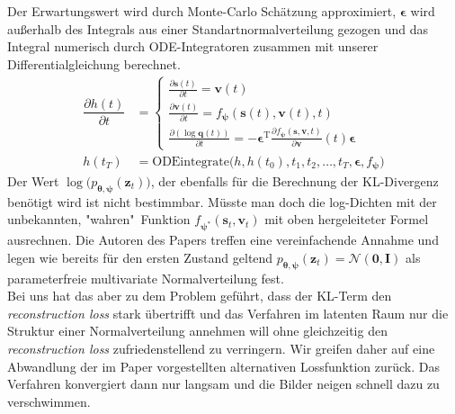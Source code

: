 \documentclass[12pt]{article}
\begin{document}
	Der Erwartungswert wird durch Monte-Carlo Schätzung approximiert, $\boldsymbol\epsilon$ wird außerhalb des Integrals aus einer Standartnormalverteilung gezogen und das Integral numerisch durch ODE-Integratoren zusammen mit unserer Differentialgleichung berechnet.\\
	\begin{align*}
	\dfrac{\partial h(t)}{\partial t}&=\begin{cases*}
	\tfrac{\partial \mathbf{s}(t)}{\partial t}=\mathbf v(t) \\
	\tfrac{\partial \mathbf{v}(t)}{\partial t}=f_{\boldsymbol{\psi}}(\mathbf s(t), \mathbf v(t), t) \\
	\tfrac{\partial (\log\mathbf{q}(t))}{\partial t}= -\boldsymbol\epsilon^\mathrm{T}\tfrac{\partial f_{\boldsymbol\psi}(\mathbf{s},\mathbf{v},t)}{\partial\mathbf{v}}(t)\boldsymbol\epsilon
	\end{cases*}\\ h(t_T)&=\text{ODEintegrate}\big(h,h(t_0),t_1,t_2,\ldots,t_T,\boldsymbol\epsilon,f_{\boldsymbol\psi}\big)
	\end{align*}
	Der Wert
	$\log\big(p_{\boldsymbol\theta,\boldsymbol\psi}(\mathbf{z}_{t}) \big)$, der ebenfalls für die Berechnung der KL-Divergenz benötigt wird ist nicht bestimmbar. Müsste man doch die log-Dichten mit der unbekannten, "wahren"\  Funktion $f_{\boldsymbol\psi^{*}}(\mathbf{s}_{t},\mathbf{v}_{t})$ mit oben hergeleiteter Formel ausrechnen.
	Die Autoren des Papers treffen eine vereinfachende Annahme und legen wie bereits für den ersten Zustand geltend $p_{\boldsymbol\theta,\boldsymbol\psi}(\mathbf{z}_{t}) = \mathcal{N}(\mathbf{0},\mathbf{I})$ als parameterfreie multivariate Normalverteilung fest.\\
	Bei uns hat das aber zu dem Problem geführt, dass der KL-Term den \emph{reconstruction loss} stark übertrifft und das Verfahren im latenten Raum nur die Struktur einer Normalverteilung annehmen will ohne gleichzeitig den \emph{reconstruction loss} zufriedenstellend zu verringern. Wir greifen daher auf eine Abwandlung der im Paper vorgestellten alternativen Lossfunktion zurück. Das Verfahren konvergiert dann nur langsam und die Bilder neigen schnell dazu zu verschwimmen. \\
\end{document}
